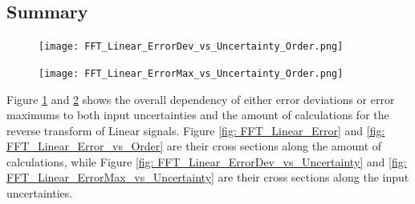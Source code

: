 \documentclass[twoside]{article}
\numberwithin{equation}{section}
\begin{document}
\subsection{Summary}

\begin{figure}[p]
\centering
\texttt{[image: FFT\_Linear\_ErrorDev\_vs\_Uncertainty\_Order.png]} 
\label{fig: FFT_Linear_ErrorDev_vs_Uncertainty_Order}
\end{figure}

\begin{figure}[p]
\centering
\texttt{[image: FFT\_Linear\_ErrorMax\_vs\_Uncertainty\_Order.png]} 
\label{fig: FFT_Linear_ErrorMax_vs_Uncertainty_Order}
\end{figure}

Figure \ref{fig: FFT_Linear_ErrorDev_vs_Uncertainty_Order} and \ref{fig: FFT_Linear_ErrorMax_vs_Uncertainty_Order} shows the overall dependency of either error deviations or error maximums to both input uncertainties and the amount of calculations for the reverse transform of Linear signals.
Figure \ref{fig: FFT_Linear_Error} and \ref{fig: FFT_Linear_Error_vs_Order} are their cross sections along the amount of calculations, while Figure \ref{fig: FFT_Linear_ErrorDev_vs_Uncertainty} and \ref{fig: FFT_Linear_ErrorMax_vs_Uncertainty} are their cross sections along the input uncertainties.
\end{document}
